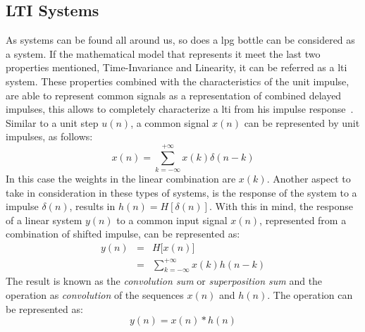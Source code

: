 \subsection{LTI Systems} \label{subsec:LTI}
As systems can be found all around us, so does a \acrshort{lpg} bottle can be considered as a system. If the mathematical model that represents it meet the last two properties mentioned, Time-Invariance and Linearity, it can be referred as a \acrlong{lti} system. These properties combined with the characteristics of the unit impulse, are able to represent common signals as a representation of combined delayed impulses, this allows to completely characterize a \acrshort{lti} from his impulse response~\cite{oppenheimSignalsSystems1997,haykin1999signals}.
Similar to a unit step $u(n)$, a common signal $x(n)$ can be represented by unit impulses, as follows:
\begin{equation}
    x(n) = \sum_{k=-\infty}^{+\infty} x(k)\delta(n-k)
\end{equation}
In this case the weights in the linear combination are $x(k)$. Another aspect to take in consideration in these types of systems, is the response of the system to a impulse $\delta(n)$, results in $h(n) = H[\delta(n)]$. With this in mind, the response of a linear system $y(n)$ to a common input signal $x(n)$, represented from a combination of shifted impulse, can be represented as:
\begin{equation}
    \begin{matrix}
        y(n) & = & H\big[x(n)\big] \\
        \ & = & \sum_{k=-\infty}^{+\infty} x(k)h(n-k)
    \end{matrix}
\end{equation}
The result is known as the \textit{convolution sum} or \textit{superposition sum} and the operation as \textit{convolution} of the sequences $x(n)$ and $h(n)$. The operation can be represented as:
\begin{equation}
    y(n) = x(n) * h(n)
\end{equation} 

